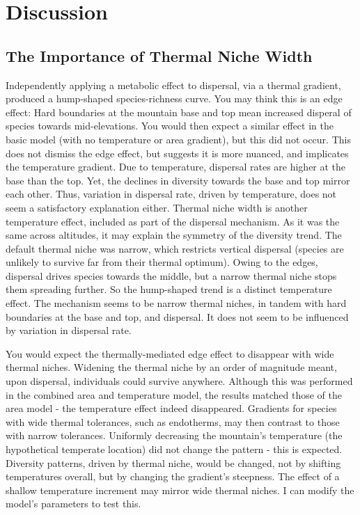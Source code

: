 \documentclass[11pt]{article}
\begin{document}
\section*{Discussion}
\subsection*{The Importance of Thermal Niche Width}
Independently applying a metabolic effect to dispersal, via a thermal gradient, produced a hump-shaped species-richness curve. You may think this is an edge effect: Hard boundaries at the mountain base and top mean increased disperal of species towards mid-elevations. You would then expect a similar effect in the basic model (with no temperature or area gradient), but this did not occur. This does not dismiss the edge effect, but suggests it is more nuanced, and implicates the temperature gradient. Due to temperature, dispersal rates are higher at the base than the top. Yet, the declines in diversity towards the base and top mirror each other. Thus, variation in dispersal rate, driven by temperature, does not seem a satisfactory explanation either. Thermal niche width is another temperature effect, included as part of the dispersal mechanism. As it was the same across altitudes, it may explain the symmetry of the diversity trend. The default thermal niche was narrow, which restricts vertical dispersal (species are unlikely to survive far from their thermal optimum). Owing to the edges, dispersal drives species towards the middle, but a narrow thermal niche stops them spreading further. So the hump-shaped trend is a distinct temperature effect. The mechanism seems to be narrow thermal niches, in tandem with hard boundaries at the base and top, and dispersal. It does not seem to be influenced by variation in dispersal rate.


You would expect the thermally-mediated edge effect to disappear with wide thermal niches. Widening the thermal niche by an order of magnitude meant, upon dispersal, individuals could survive anywhere. Although this was performed in the combined area and temperature model, the results matched those of the area model - the temperature effect indeed disappeared. Gradients for species with wide thermal tolerances, such as endotherms, may then contrast to those with narrow tolerances. Uniformly decreasing the mountain’s temperature (the hypothetical temperate location) did not change the pattern - this is expected. Diversity patterns, driven by thermal niche, would be changed, not by shifting temperatures overall, but by changing the gradient’s steepness. The effect of a shallow temperature increment may mirror wide thermal niches. I can modify the model’s parameters to test this.
\end{document}
